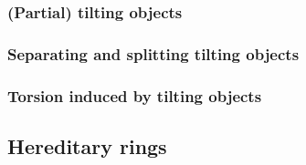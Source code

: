         \subsubsection{(Partial) tilting objects}
        
        \subsubsection{Separating and splitting tilting objects}
        
        \subsubsection{Torsion induced by tilting objects}
        
    \subsection{Hereditary rings}    
